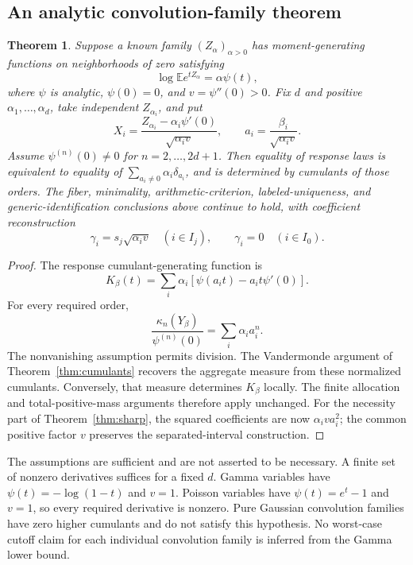 \documentclass[11pt]{article}
\newtheorem{theorem}{Theorem}[section]
\theoremstyle{definition}\newtheorem{definition}[theorem]{Definition}
\theoremstyle{remark}\newtheorem{remark}[theorem]{Remark}
\newcommand{\E}{\mathbb E}
\begin{document}
\subsection{An analytic convolution-family theorem}
\begin{theorem}\label{thm:family}
Suppose a known family $(Z_\alpha)_{\alpha>0}$ has moment-generating functions on neighborhoods of zero satisfying
\[
 \log\E e^{tZ_\alpha}=\alpha\psi(t),
\]
where $\psi$ is analytic, $\psi(0)=0$, and $v=\psi''(0)>0$. Fix $d$ and positive $\alpha_1,\ldots,\alpha_d$, take independent $Z_{\alpha_i}$, and put
\begin{equation}\label{eq:family}
 X_i=\frac{Z_{\alpha_i}-\alpha_i\psi'(0)}{\sqrt{\alpha_i v}},
 \qquad a_i=\frac{\beta_i}{\sqrt{\alpha_i v}}.
\end{equation}
Assume $\psi^{(n)}(0)\ne0$ for $n=2,\ldots,2d+1$. Then equality of response laws is equivalent to equality of $\sum_{a_i\ne0}\alpha_i\delta_{a_i}$, and is determined by cumulants of those orders. The fiber, minimality, arithmetic-criterion, labeled-uniqueness, and generic-identification conclusions above continue to hold, with coefficient reconstruction
\[
 \gamma_i=s_j\sqrt{\alpha_i v}\quad(i\in I_j),\qquad
 \gamma_i=0\quad(i\in I_0).
\]
\end{theorem}
\begin{proof}
The response cumulant-generating function is
\[
 K_\beta(t)=\sum_i\alpha_i[\psi(a_it)-a_it\psi'(0)].
\]
For every required order,
\[
 \frac{\kappa_n(Y_\beta)}{\psi^{(n)}(0)}=\sum_i\alpha_i a_i^n.
\]
The nonvanishing assumption permits division. The Vandermonde argument of Theorem~\ref{thm:cumulants} recovers the aggregate measure from these normalized cumulants. Conversely, that measure determines $K_\beta$ locally. The finite allocation and total-positive-mass arguments therefore apply unchanged. For the necessity part of Theorem~\ref{thm:sharp}, the squared coefficients are now $\alpha_i v a_i^2$; the common positive factor $v$ preserves the separated-interval construction.
\end{proof}
The assumptions are sufficient and are not asserted to be necessary. A finite set of nonzero derivatives suffices for a fixed $d$. Gamma variables have $\psi(t)=-\log(1-t)$ and $v=1$. Poisson variables have $\psi(t)=e^t-1$ and $v=1$, so every required derivative is nonzero. Pure Gaussian convolution families have zero higher cumulants and do not satisfy this hypothesis. No worst-case cutoff claim for each individual convolution family is inferred from the Gamma lower bound.
\end{document}
